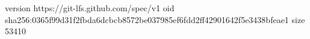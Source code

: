 version https://git-lfs.github.com/spec/v1
oid sha256:0365f99d31f2fbda6dcbcb8572be037985ef6fdd2ff42901642f5e3438bfeae1
size 53410
